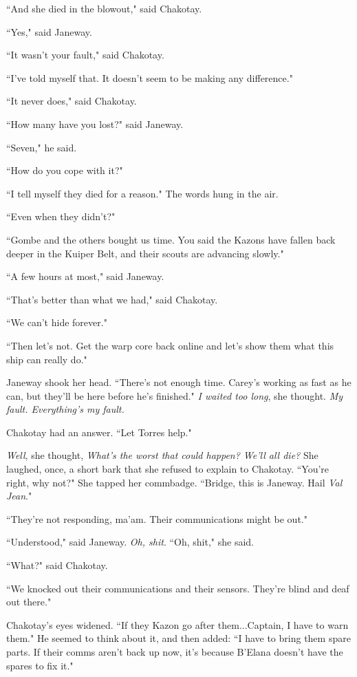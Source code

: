 \documentclass[twoside,letterpaper,12pt]{memoir}
\begin{document}
``And she died in the blowout," said Chakotay.

``Yes," said Janeway.

``It wasn't your fault," said Chakotay.

``I've told myself that. It doesn't seem to be making any difference."

``It never does," said Chakotay.

``How many have you lost?" said Janeway.

``Seven," he said.

``How do you cope with it?"

``I tell myself they died for a reason." The words hung in the air.

``Even when they didn't?"

``Gombe and the others bought us time. You said the Kazons have fallen back deeper in the Kuiper Belt, and their scouts are advancing slowly."

``A few hours at most," said Janeway.

``That's better than what we had," said Chakotay.

``We can't hide forever."

``Then let's not. Get the warp core back online and let's show them what this ship can really do."

Janeway shook her head. ``There's not enough time. Carey's working as fast as he can, but they'll be here before he's finished." \textit{I waited too long}, she thought. \textit{My fault. Everything's my fault.}

Chakotay had an answer. ``Let Torres help."

\textit{Well}, she thought, \textit{What's the worst that could happen? We'll all die?} She laughed, once, a short bark that she refused to explain to Chakotay. ``You're right, why not?" She tapped her commbadge. ``Bridge, this is Janeway. Hail \textit{Val Jean}."

``They're not responding, ma'am. Their communications might be out."

``Understood," said Janeway. \textit{Oh, shit}. ``Oh, shit," she said.

``What?" said Chakotay.

``We knocked out their communications and their sensors. They're blind and deaf out there."

Chakotay's eyes widened. ``If they Kazon go after them...Captain, I have to warn them." He seemed to think about it, and then added: ``I have to bring them spare parts. If their comms aren't back up now, it's because B'Elana doesn't have the spares to fix it."
\end{document}
